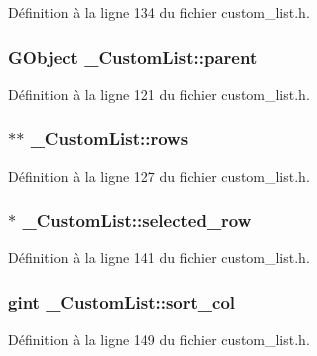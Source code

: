 Définition à la ligne 134 du fichier custom\_\-list.h.

\subsubsection[{parent}]{\setlength{\rightskip}{0pt plus 5cm}GObject {\bf \_\-CustomList::parent}}\label{struct__CustomList_a11f37d3c034a8681a24fef97ceabb8dd}


Définition à la ligne 121 du fichier custom\_\-list.h.

\subsubsection[{rows}]{$\ast$$\ast$ {\bf \_\-CustomList::rows}}\label{struct__CustomList_a29febef0c197ed8b57888a0a4a95951e}


Définition à la ligne 127 du fichier custom\_\-list.h.

\subsubsection[{selected\_\-row}]{$\ast$ {\bf \_\-CustomList::selected\_\-row}}\label{struct__CustomList_a399bf9b47ca21e8813843dad66db6d51}


Définition à la ligne 141 du fichier custom\_\-list.h.

\subsubsection[{sort\_\-col}]{\setlength{\rightskip}{0pt plus 5cm}gint {\bf \_\-CustomList::sort\_\-col}}\label{struct__CustomList_a043a204c10d9b9ad0411c75f9ccc1aca}


Définition à la ligne 149 du fichier custom\_\-list.h.

